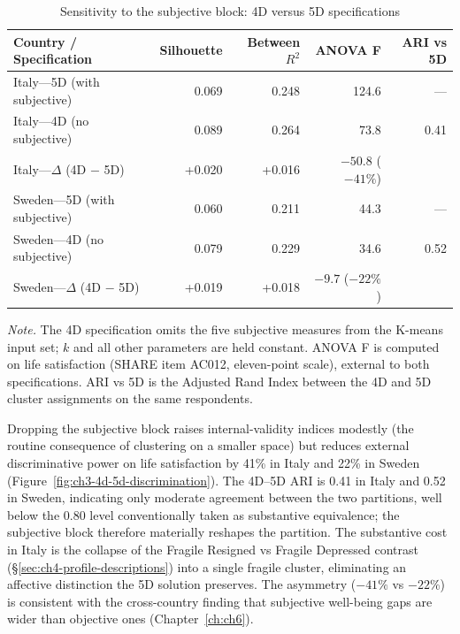 \begin{table}[!htbp]
  \centering
  \caption[Subjective-block sensitivity, 4D vs 5D]{Sensitivity to the subjective block: 4D versus 5D specifications}
  \label{tab:ch3-4d-5d-sensitivity}
  \small
  \setlength{\tabcolsep}{5pt}
  \begin{tabular}{lrrrr}
    \toprule
    \textbf{Country / Specification} & \textbf{Silhouette} & \textbf{Between $R^2$} & \textbf{ANOVA F} & \textbf{ARI vs 5D} \\
    \midrule
    Italy---5D (with subjective) & 0.069 & 0.248 & 124.6 &---\\
    Italy---4D (no subjective) & 0.089 & 0.264 & 73.8 & 0.41 \\
    Italy---$\Delta$ (4D $-$ 5D) & +0.020 & +0.016 & $-50.8$ ($-41\%$) & \\
    Sweden---5D (with subjective) & 0.060 & 0.211 & 44.3 &---\\
    Sweden---4D (no subjective) & 0.079 & 0.229 & 34.6 & 0.52 \\
    Sweden---$\Delta$ (4D $-$ 5D) & +0.019 & +0.018 & $-9.7$ ($-22\%$) & \\
    \bottomrule
  \end{tabular}
  \par\medskip
  \begin{minipage}{\linewidth}
    \footnotesize\textit{Note.} The 4D specification omits the five subjective measures from the K-means input set; $k$ and all other parameters are held constant. ANOVA F is computed on life satisfaction (SHARE item AC012, eleven-point scale), external to both specifications. ARI vs 5D is the Adjusted Rand Index between the 4D and 5D cluster assignments on the same respondents.
  \end{minipage}
\end{table}

Dropping the subjective block raises internal-validity indices modestly (the routine consequence of clustering on a smaller space) but reduces external discriminative power on life satisfaction by 41\% in Italy and 22\% in Sweden (Figure~\ref{fig:ch3-4d-5d-discrimination}). The 4D--5D ARI is 0.41 in Italy and 0.52 in Sweden, indicating only moderate agreement between the two partitions, well below the 0.80 level conventionally taken as substantive equivalence; the subjective block therefore materially reshapes the partition. The substantive cost in Italy is the collapse of the Fragile Resigned vs Fragile Depressed contrast (\S\ref{sec:ch4-profile-descriptions}) into a single fragile cluster, eliminating an affective distinction the 5D solution preserves. The asymmetry ($-41\%$ vs $-22\%$) is consistent with the cross-country finding that subjective well-being gaps are wider than objective ones (Chapter~\ref{ch:ch6}).

